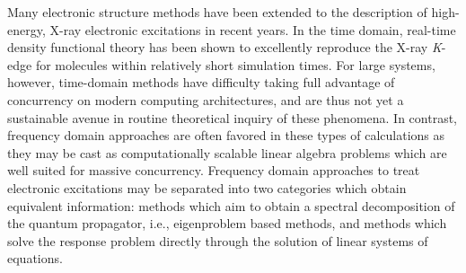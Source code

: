 Many electronic structure methods have been extended to the
description of high-energy, X-ray electronic excitations in recent years. In
the time domain, real-time density functional theory\cite{Li05_233,Li07_199,Li11_184102} has been shown to
excellently reproduce the X-ray \emph{K}-edge for molecules within relatively
short simulation times.\cite{Govind12_3284,Lopata16_3741} For large systems,
however, time-domain methods have difficulty taking full advantage of
concurrency on modern computing architectures, and are thus not yet a
sustainable avenue in routine theoretical inquiry of these phenomena. In contrast,
frequency domain approaches are often favored in these types of calculations as
they may be cast as computationally scalable linear algebra problems which are
well suited for massive concurrency. Frequency domain approaches to treat
electronic excitations may be separated into two categories which obtain equivalent information:
methods which aim to obtain a spectral decomposition of the quantum propagator, i.e., eigenproblem based methods, and methods which solve the response problem directly through the solution of linear systems of equations. 

